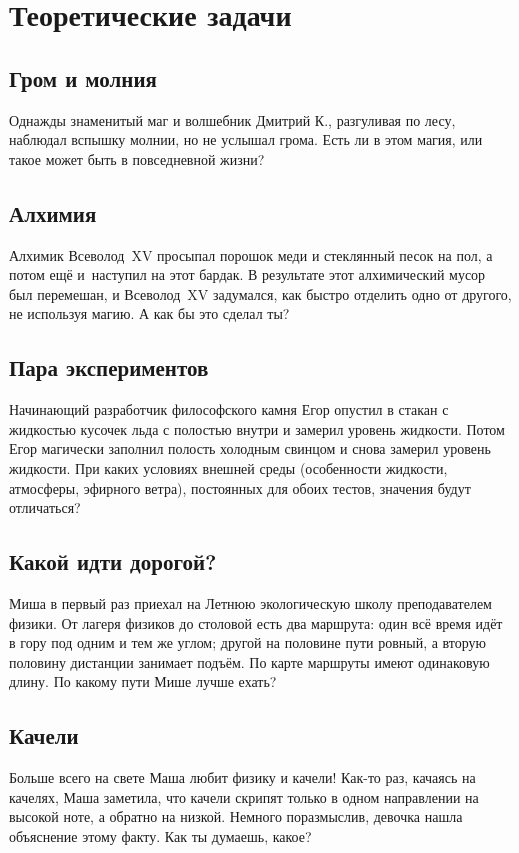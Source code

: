 \documentclass[a4paper,12pt]{article}
\begin{document}
\section{Теоретические задачи}

\subsection{Гром и молния}
Однажды знаменитый маг и волшебник Дмитрий К., разгуливая по лесу, наблюдал вспышку молнии,
но не услышал грома. Есть ли в этом магия, или такое может быть в повседневной жизни?

\subsection{Алхимия}
Алхимик Всеволод~XV просыпал порошок меди и стеклянный песок на пол, а потом ещё
и~наступил на этот бардак. В результате этот алхимический мусор был перемешан,
и Всеволод~XV задумался, как быстро отделить одно от другого, не используя магию.
А как бы это сделал ты?

\subsection{Пара экспериментов}
Начинающий разработчик философского камня Егор опустил в стакан с жидкостью кусочек
льда с полостью внутри и замерил уровень жидкости. Потом Егор магически заполнил
полость холодным свинцом и снова замерил уровень жидкости. При каких условиях
внешней среды (особенности жидкости, атмосферы, эфирного ветра), постоянных
для обоих тестов, значения будут отличаться?

\subsection{Какой идти дорогой?}
Миша в первый раз приехал на Летнюю экологическую школу преподавателем физики.
От лагеря физиков до столовой есть два маршрута: один всё время идёт в гору
под одним и тем же углом; другой на половине пути ровный, а вторую половину
дистанции занимает подъём. По карте маршруты имеют одинаковую длину.
По какому пути Мише лучше ехать?

\subsection{Качели}
Больше всего на свете Маша любит физику и качели! Как-то раз, качаясь на качелях,
Маша заметила, что качели скрипят только в одном направлении на высокой ноте,
а обратно на низкой. Немного поразмыслив, девочка нашла объяснение этому факту.
Как ты думаешь, какое?
\end{document}
